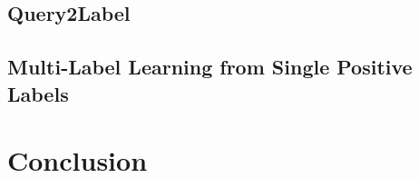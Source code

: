 \documentclass[lettersize,journal]{IEEEtran}
\begin{document}
\subsection{Query2Label}

\subsection{Multi-Label Learning from Single Positive Labels}


\section{Conclusion}






\end{document}
